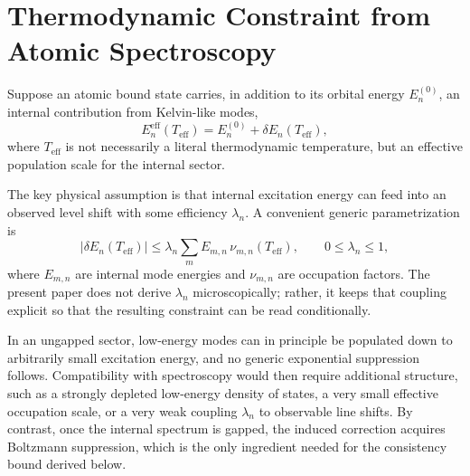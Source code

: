 \documentclass[pdflatex,sn-mathphys-num]{sn-jnl}
\begin{document}
    \section{Thermodynamic Constraint from Atomic Spectroscopy}\label{sec:constraint}
        Suppose an atomic bound state carries, in addition to its orbital energy $E_n^{(0)}$, an internal contribution from Kelvin-like modes,
        \begin{equation}
            E_n^{\mathrm{eff}}(T_{\mathrm{eff}})
            =
            E_n^{(0)} + \delta E_n(T_{\mathrm{eff}}),
        \end{equation}
        where $T_{\mathrm{eff}}$ is not necessarily a literal thermodynamic temperature, but an effective population scale for the internal sector.

        The key physical assumption is that internal excitation energy can feed into an observed level shift with some efficiency $\lambda_n$. A convenient generic parametrization is
        \begin{equation}
            |\delta E_n(T_{\mathrm{eff}})|
            \le
            \lambda_n \sum_m E_{m,n}\, \nu_{m,n}(T_{\mathrm{eff}}),
            \qquad 0\le \lambda_n \le 1,
            \label{eq:generic_coupling_bound}
        \end{equation}
        where $E_{m,n}$ are internal mode energies and $\nu_{m,n}$ are occupation factors. The present paper does not derive $\lambda_n$ microscopically; rather, it keeps that coupling explicit so that the resulting constraint can be read conditionally.

        In an ungapped sector, low-energy modes can in principle be populated down to arbitrarily small excitation energy, and no generic exponential suppression follows. Compatibility with spectroscopy would then require additional structure, such as a strongly depleted low-energy density of states, a very small effective occupation scale, or a very weak coupling $\lambda_n$ to observable line shifts. By contrast, once the internal spectrum is gapped, the induced correction acquires Boltzmann suppression, which is the only ingredient needed for the consistency bound derived below.

\end{document}
